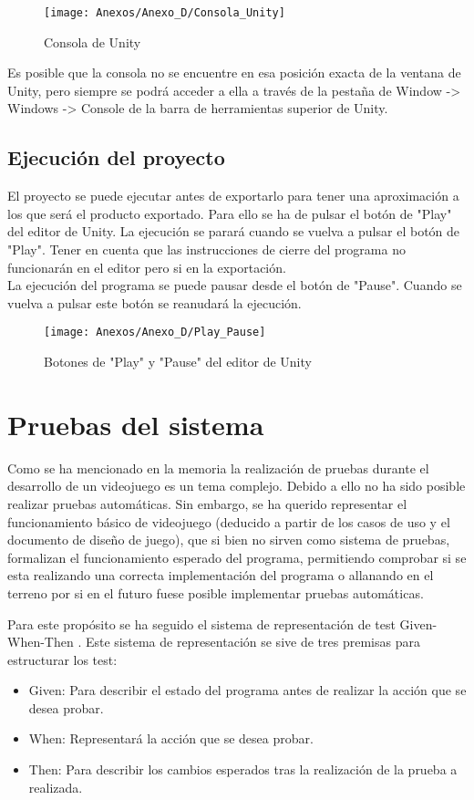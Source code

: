 \begin{figure}[h]
\centering
\texttt{[image: Anexos/Anexo\_D/Consola\_Unity]}
\caption{Consola de Unity}
\end{figure}

Es posible que la consola no se encuentre en esa posición exacta de la ventana de Unity, pero siempre se podrá acceder a ella a través de la pestaña de Window -> Windows -> Console de la barra de herramientas superior de Unity.

\subsection{Ejecución del proyecto}
El proyecto se puede ejecutar antes de exportarlo para tener una aproximación a los que será el producto exportado. Para ello se ha de pulsar el botón de "Play" del editor de Unity. La ejecución se parará cuando se vuelva a pulsar el botón de "Play". Tener en cuenta que las instrucciones de cierre del programa no funcionarán en el editor pero si en la exportación.\\
La ejecución del programa se puede pausar desde el botón de "Pause". Cuando se vuelva a pulsar este botón se reanudará la ejecución.

\begin{figure}[h]
\centering
\texttt{[image: Anexos/Anexo\_D/Play\_Pause]}
\caption{Botones de "Play" y "Pause" del editor de Unity}
\end{figure}

\section{Pruebas del sistema}
Como se ha mencionado en la memoria la realización de pruebas durante el desarrollo de un videojuego es un tema complejo. Debido a ello no ha sido posible realizar pruebas automáticas. Sin embargo, se ha querido representar el funcionamiento básico de videojuego (deducido a partir de los casos de uso y el documento de diseño de juego), que si bien no sirven como sistema de pruebas, formalizan el funcionamiento esperado del programa, permitiendo comprobar si se esta realizando una correcta implementación del programa o allanando en el terreno por si en el futuro fuese posible implementar pruebas automáticas.

Para este propósito se ha seguido el sistema de representación de test Given-When-Then \cite{GWT}. Este sistema de representación se sive de tres premisas para estructurar los test:
\begin{itemize}
\item
Given: Para describir el estado del programa antes de realizar la acción que se desea probar.
\item
When: Representará la acción que se desea probar.
\item
Then: Para describir los cambios esperados tras la realización de la prueba a realizada.
\end{itemize}

